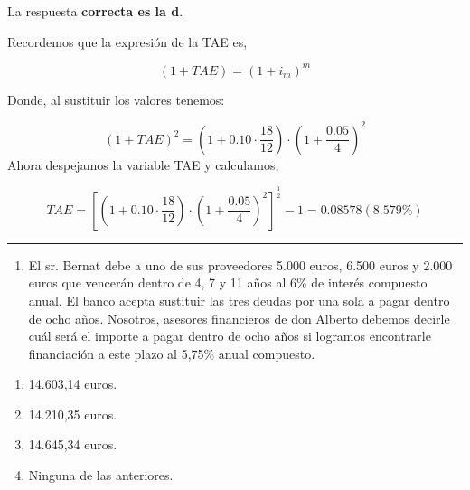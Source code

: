 \documentclass[
  letterpaper,
  DIV=11,
  numbers=noendperiod]{scrreprt}
\providecommand{\tightlist}{%
  \setlength{\itemsep}{0pt}\setlength{\parskip}{0pt}}\usepackage{longtable,booktabs,array}
\begin{document}
\begin{tcolorbox}[enhanced jigsaw, left=2mm, opacityback=0, colback=white, breakable, arc=.35mm, bottomrule=.15mm, rightrule=.15mm, toprule=.15mm, leftrule=.75mm, colframe=quarto-callout-tip-color-frame]
\begin{minipage}[t]{5.5mm}
\textcolor{quarto-callout-tip-color}{\faLightbulb}
\end{minipage}%
\begin{minipage}[t]{\textwidth - 5.5mm}

La respuesta \textbf{correcta es la d}.

Recordemos que la expresión de la TAE es,

\[(1+TAE)=(1+ i _m)^m\]

Donde, al sustituir los valores tenemos:

\[\left(1+TAE\right)^2=\left(1+0.10\cdot\frac{18}{12}\right)\cdot\left(1+\frac{0.05}{4}\right)^2\]
Ahora despejamos la variable TAE y calculamos,

\[TAE=\left[\left(1+0.10\cdot\frac{18}{12}\right)\cdot\left(1+\frac{0.05}{4}\right)^2\right]^{\frac{1}{2}}-1=0.08578(8.579\%)\]

\end{minipage}%
\end{tcolorbox}

\begin{center}\rule{0.5\linewidth}{0.5pt}\end{center}

\begin{enumerate}
\def\labelenumi{\arabic{enumi}.}
\setcounter{enumi}{19}
\tightlist
\item
  El sr. Bernat debe a uno de sus proveedores 5.000 euros, 6.500 euros y
  2.000 euros que vencerán dentro de 4, 7 y 11 años al 6\% de interés
  compuesto anual. El banco acepta sustituir las tres deudas por una
  sola a pagar dentro de ocho años. Nosotros, asesores financieros de
  don Alberto debemos decirle cuál será el importe a pagar dentro de
  ocho años si logramos encontrarle financiación a este plazo al 5,75\%
  anual compuesto.
\end{enumerate}

\begin{enumerate}
\def\labelenumi{\alph{enumi})}
\item
  14.603,14 euros.
\item
  14.210,35 euros.
\item
  14.645,34 euros.
\item
  Ninguna de las anteriores.
\end{enumerate}
\end{document}
